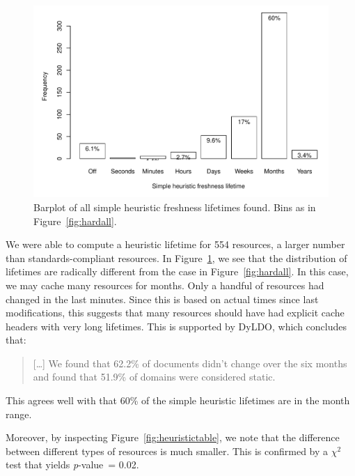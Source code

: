 \documentclass{llncs}
\newcommand{\pvalue}{\textit{p}-value\ }
\begin{document}
\begin{figure}[th!]
  \centerline{%
    \includegraphics[width=.9\textwidth]{heuristicall.pdf}}
  \caption{Barplot of all simple heuristic freshness lifetimes
    found. Bins as in Figure~\ref{fig:hardall}.}
  \label{fig:heuristicall}
\end{figure}

We were able to compute a heuristic lifetime for 554 resources, a
larger number than standards-compliant resources. In
Figure~\ref{fig:heuristicall}, we see that the distribution of
lifetimes are radically different from the case in
Figure~\ref{fig:hardall}. In this case, we may cache many resources
for months. Only a handful of resources had changed in the last
minutes. Since this is based on actual times since last modifications,
this suggests that many resources should have had explicit cache
headers with very long lifetimes. This is supported by
DyLDO\cite{dyldo2}, which concludes that:
\begin{quote}
[\ldots] We found that 62.2\% of documents didn’t change over the six
months and found that 51.9\% of domains were considered static.
\end{quote}
This agrees well with that 60\% of the simple heuristic lifetimes are
in the month range. 

Moreover, by inspecting Figure~\ref{fig:heuristictable}, we
note that the difference between different types of resources is much
smaller. This is confirmed by a $\chi^2$ test that yields \pvalue =
0.02.
\end{document}
